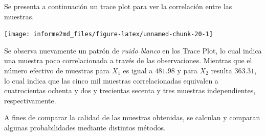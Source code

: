 \documentclass[
]{article}
\newenvironment{Shaded}{\begin{snugshade}}{\end{snugshade}}
\newcommand{\AttributeTok}[1]{\textcolor[rgb]{0.13,0.29,0.53}{#1}}
\newcommand{\ControlFlowTok}[1]{\textcolor[rgb]{0.13,0.29,0.53}{\textbf{#1}}}
\newcommand{\DecValTok}[1]{\textcolor[rgb]{0.00,0.00,0.81}{#1}}
\newcommand{\FunctionTok}[1]{\textcolor[rgb]{0.13,0.29,0.53}{\textbf{#1}}}
\newcommand{\NormalTok}[1]{#1}
\newcommand{\OtherTok}[1]{\textcolor[rgb]{0.56,0.35,0.01}{#1}}
\newcommand{\SpecialCharTok}[1]{\textcolor[rgb]{0.81,0.36,0.00}{\textbf{#1}}}
\newcommand{\StringTok}[1]{\textcolor[rgb]{0.31,0.60,0.02}{#1}}
\begin{document}
Se presenta a continuación un trace plot para ver la correlación entre
las muestras.

\begin{Shaded}
\end{Shaded}

\begin{center}\texttt{[image: informe2md\_files/figure-latex/unnamed-chunk-20-1]} \end{center}

Se observa nuevamente un patrón de \emph{ruido blanco} en los Trace
Plot, lo cual indica una muestra poco correlacionada a través de las
observaciones. Mientras que el número efectivo de muestras para \(X_1\)
es igual a \(481.98\) y para \(X_2\) resulta \(363.31\), lo cual indica
que las cinco mil muestras correlacionadas equivalen a cuatrocientas
ochenta y dos y trecientas secenta y tres muestras independientes,
respectivamente.

A fines de comparar la calidad de las muestras obtenidas, se calculan y
comparan algunas probabilidades mediante distintos métodos.
\end{document}
